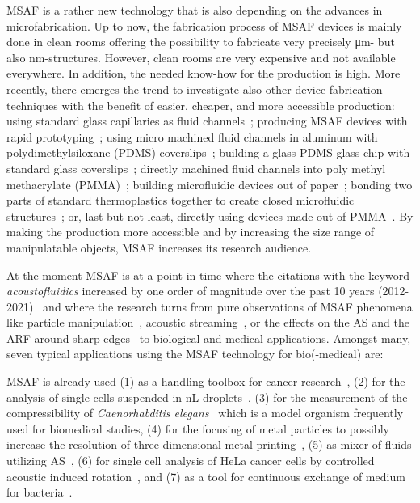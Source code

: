 MSAF is a rather new technology that is also depending on the advances in 
microfabrication. Up to now, the fabrication process of MSAF devices is mainly 
done in clean rooms offering the possibility to fabricate very precisely 
\si{\um}- but also \si{\nm}-structures. However, clean rooms are very expensive 
and not available everywhere. In addition, the needed know-how for the 
production is high. More recently, there emerges the trend to investigate also 
other device fabrication techniques with the benefit of easier, cheaper, and 
more accessible production: using standard glass capillaries as fluid 
channels~\cite{Wiklund2001,Hammarstrom2010,Hammarstrom2012,Mishra2014,Gralinski2014,Gerlt2022}; 
producing MSAF devices with rapid prototyping~\cite{Adams2012}; using micro 
machined fluid channels in aluminum with polydimethylsiloxane (PDMS) 
coverslips~\cite{Gautam2018}; building a glass-PDMS-glass chip with standard 
glass coverslips~\cite{Xu2019}; directly machined fluid channels into poly 
methyl methacrylate (PMMA)~\cite{Harris2012}; building microfluidic devices out 
of paper~\cite{Martinez2010}; bonding two parts of standard thermoplastics 
together to create closed microfluidic structures~\cite{Mueller2013}; or, last 
but not least, directly using devices made out of 
PMMA~\cite{Gonzalez2015,Yang2017}. By making the production more accessible and 
by increasing the size range of manipulatable objects, MSAF increases its 
research audience.

At the moment MSAF is at a point in time where the citations with the keyword 
\emph{acoustofluidics} increased by one order of magnitude over the past 10 
years (2012-2021)~\cite{Novotny2021} and where the research turns from pure 
observations of MSAF phenomena like particle 
manipulation~\cite{Wiklund2012a,Laurell2007,Collins2016,Gedge2012,Ding2012b,Cetin2016b,Aubert2016,Novotny2021}, 
acoustic streaming~\cite{Hoyos2013,Castro2016,Lei2016}, or the effects on the 
AS and the ARF around sharp 
edges~\cite{Leibacher2015,Chen2021,Doinikov2020,Doinikov2020b} to biological 
and medical applications. Amongst many, seven typical applications using the 
MSAF technology for bio(-medical) are:

MSAF is already used (1) as a handling toolbox for cancer 
research~\cite{Antfolk2015,Wu2021,Wang2020,Nguyen2021}, (2) for the analysis of 
single cells suspended in \si{\nano\liter} droplets~\cite{Gerlt2020a}, (3) for 
the measurement of the compressibility of \emph{Caenorhabditis 
elegans}~\cite{Baasch2018} which is a model organism frequently used for 
biomedical studies, (4) for the focusing of metal particles to possibly 
increase the resolution of three dimensional metal printing~\cite{Gerlt2022}, 
(5) as mixer of fluids utilizing 
AS~\cite{Patel2014,Ozcelik2014,Bachman2020,Zhang2021}, (6) for single cell 
analysis of HeLa cancer cells by controlled acoustic induced 
rotation~\cite{Laeubli2021}, and (7) as a tool for continuous exchange of 
medium for bacteria~\cite{Gerlt2021}.

